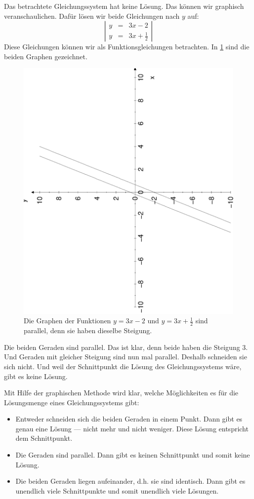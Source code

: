 \documentclass[%
11pt,%
twoside,%
titlepage,%
german,%
]{scrartcl}
\newenvironment{system}{\begin{displaymath}
  \left| 
    \begin{array}{rcl}}{\end{array} \right| 
\end{displaymath}}
\begin{document}
Das betrachtete Gleichungssystem hat keine L\"osung. Das k\"onnen wir graphisch veranschaulichen. Daf\"ur l\"osen wir beide Gleichungen nach $y$ auf:
\begin{system}
  y & = & 3x-2 \\
  y & = & 3x+\frac{1}{2}
\end{system}Diese Gleichungen k\"onnen wir als Funktionsgleichungen betrachten. In \ref{fig:linglsyst:parallel} sind die beiden Graphen gezeichnet.

\begin{figure}[t!]
  \centering
  \includegraphics[angle=-90,width=0.9\columnwidth]{pictures/parallel.eps}
  \caption{Die Graphen der Funktionen $y=3x-2$ und $y=3x+\frac{1}{2}$ sind parallel, denn sie haben dieselbe Steigung.}
  \label{fig:linglsyst:parallel}
\end{figure}

Die beiden Geraden sind parallel. Das ist klar, denn beide haben die Steigung 3. Und Geraden mit gleicher Steigung sind nun mal parallel. Deshalb schneiden sie sich nicht. Und weil der Schnittpunkt die L\"osung des Gleichungssystems w\"are, gibt es keine L\"osung.

Mit Hilfe der graphischen Methode wird klar, welche M\"oglichkeiten es f\"ur die L\"osungsmenge eines Gleichungssystems gibt:
\begin{itemize}
\item Entweder schneiden sich die beiden Geraden in einem Punkt. Dann gibt es genau eine L\"osung --- nicht mehr und nicht weniger. Diese L\"osung entspricht dem Schnittpunkt.
\item Die Geraden sind parallel. Dann gibt es keinen Schnittpunkt und somit keine L\"osung.
\item Die beiden Geraden liegen aufeinander, d.h. sie sind identisch. Dann gibt es unendlich viele Schnittpunkte und somit unendlich viele L\"osungen.
\end{itemize}
\end{document}
